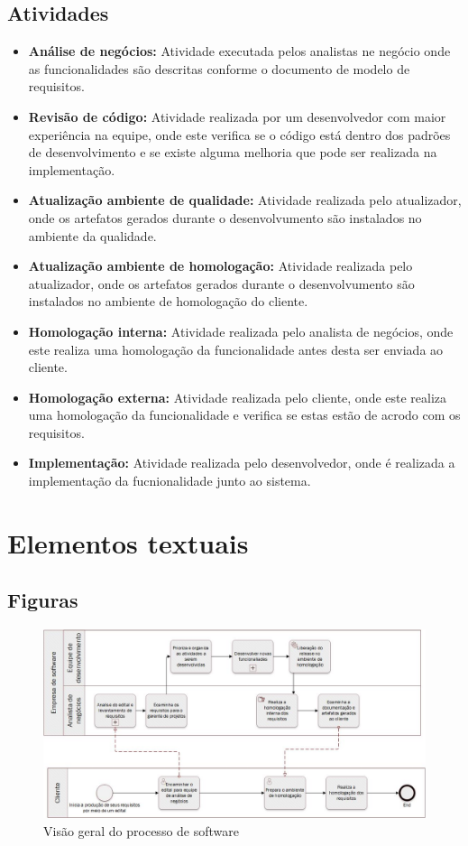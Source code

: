 \documentclass[	DIV=calc,%
							paper=a4,%
							fontsize=12pt,%
							onecolumn]{scrartcl}	 					%
\begin{document}
\subsection{Atividades}
\begin{itemize}
	\item \textbf{Análise de negócios:} Atividade executada pelos analistas ne negócio onde as funcionalidades são descritas conforme o documento de modelo de requisitos.
	\item \textbf{Revisão de código:} Atividade realizada por um desenvolvedor com maior experiência na equipe, onde este verifica se o código está dentro dos padrões
	de desenvolvimento e se existe alguma melhoria que pode ser realizada na implementação.
	\item \textbf{Atualização ambiente de qualidade:} Atividade realizada pelo atualizador, onde os artefatos gerados durante o desenvolvumento são instalados no ambiente
	da qualidade.
	\item \textbf{Atualização ambiente de homologação:} Atividade realizada pelo atualizador, onde os artefatos gerados durante o desenvolvumento são instalados no ambiente
	de homologação do cliente.
	\item \textbf{Homologação interna:} Atividade realizada pelo analista de negócios, onde este realiza uma homologação da funcionalidade antes desta ser enviada ao cliente.
	\item \textbf{Homologação externa:} Atividade realizada pelo cliente, onde este realiza uma homologação da funcionalidade e verifica se estas estão de acrodo com os requisitos.
	\item \textbf{Implementação:}  Atividade realizada pelo desenvolvedor, onde é realizada a implementação da fucnionalidade junto ao sistema.
\end{itemize}


\clearpage
\section{Elementos textuais}

\subsection{Figuras}


\begin{figure}
	\centering
	\includegraphics[width=\textwidth]{processo_de_software_BPMN1}
	\caption{Visão geral do processo de software}
\end{figure}
\end{document}
